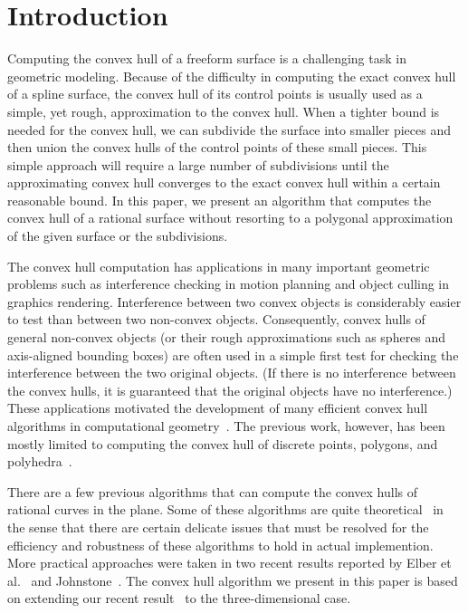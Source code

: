 \documentclass{elsart}
\begin{document}
\section{Introduction}
\label{sec-introduction}

Computing the convex hull of a freeform surface
is a challenging task in geometric modeling.
Because of the difficulty in computing the exact convex hull
of a spline surface, the convex hull of its control points is usually
used as a simple, yet rough, approximation to the convex hull.
When a tighter bound is needed for the convex hull, we can subdivide
the surface into smaller pieces and then union the convex hulls of
the control points of these small pieces. 
This simple approach will require a large number of subdivisions 
until the approximating convex hull converges to the exact convex hull
within a certain reasonable bound.  In this paper, we present
an algorithm that computes the convex hull of a rational surface
without resorting to a polygonal approximation of the given surface
or the subdivisions.

The convex hull computation has applications in many important
geometric problems such as interference checking in motion planning
and object culling in graphics rendering.  Interference between two convex
objects is considerably easier to test than between two non-convex objects.
Consequently, convex hulls of general non-convex objects (or their rough
approximations such as spheres and axis-aligned bounding boxes) are often used
in a simple first test for checking the interference between the two
original objects.   (If there is no interference between the convex hulls,
it is guaranteed that the original objects have no interference.)
These applications motivated the development of many efficient
convex hull algorithms in computational geometry~\cite{Prep85}.
The previous work, however, has been mostly limited to computing
the convex hull of discrete points, polygons, and
polyhedra~\cite{Graham83,Lee83,Prep85}.

There are a few previous algorithms that can compute the convex hulls
of rational curves in the plane.  Some of these algorithms are quite
theoretical~\cite{Kim91,Souvaine90,Schaeffer87} in the sense that
there are certain delicate issues that must be resolved for the efficiency
and robustness of these algorithms to hold in actual implemention.
More practical approaches were taken in two recent results reported
by Elber et al.~\cite{Elber2001b} and Johnstone~\cite{Johnstone2001}.
The convex hull algorithm we present in this paper is based on
extending our recent result~\cite{Elber2001b} to the three-dimensional case.
\end{document}
